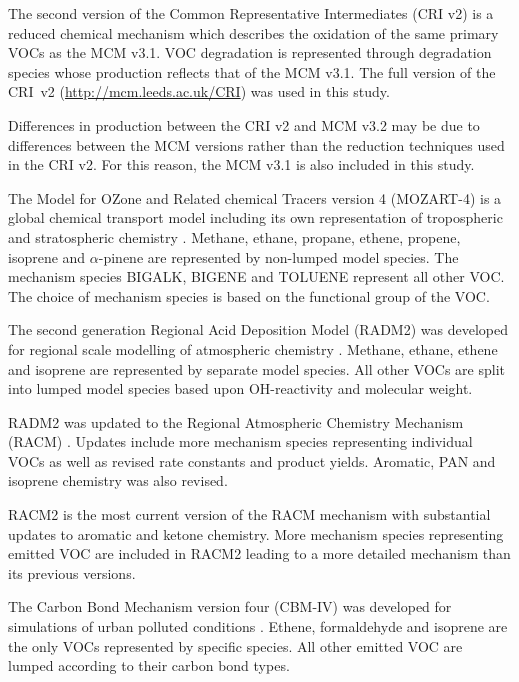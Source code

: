 The second version of the Common Representative Intermediates (CRI v2) \citep{Jenkin:2008} is a reduced chemical mechanism which describes the oxidation of the same primary VOCs as the MCM v3.1. 
VOC degradation is represented through degradation species whose  production reflects that of the MCM v3.1. 
The full version of the \mbox{CRI v2} (\url{http://mcm.leeds.ac.uk/CRI}) was used in this study.

Differences in  production between the CRI v2 and MCM v3.2 may be due to differences between the MCM versions rather than the reduction techniques used in the CRI v2. 
For this reason, the MCM v3.1 is also included in this study.

The Model for OZone and Related chemical Tracers version 4 (MOZART-4) is a global chemical transport model including its own representation of tropospheric and stratospheric chemistry \citep{Emmons:2010}. 
Methane, ethane, propane, ethene, propene, isoprene and $\alpha$-pinene are represented by non-lumped model species. 
The mechanism species BIGALK, BIGENE and TOLUENE represent all other VOC. 
The choice of mechanism species is based on the functional group of the VOC.

The second generation Regional Acid Deposition Model (RADM2) was developed for regional scale modelling of atmospheric chemistry \citep{Stockwell:1990}. 
Methane, ethane, ethene and isoprene are represented by separate model species. 
All other VOCs are split into lumped model species based upon OH-reactivity and molecular weight.

RADM2 was updated to the Regional Atmospheric Chemistry Mechanism (RACM) \citep{Stockwell:1997}. 
Updates include more mechanism species representing individual VOCs as well as revised rate constants and product yields. 
Aromatic, PAN and isoprene chemistry was also revised.

RACM2 is the most current version of the RACM mechanism \citep{Goliff:2013} with substantial updates to aromatic and ketone chemistry. 
More mechanism species representing emitted VOC are included in RACM2 leading to a more detailed mechanism than its previous versions.

The Carbon Bond Mechanism version four (CBM-IV) was developed for simulations of urban polluted conditions \citep{Gery:1989}. 
Ethene, formaldehyde and isoprene are the only VOCs represented by specific species. 
All other emitted VOC are lumped according to their carbon bond types. 

